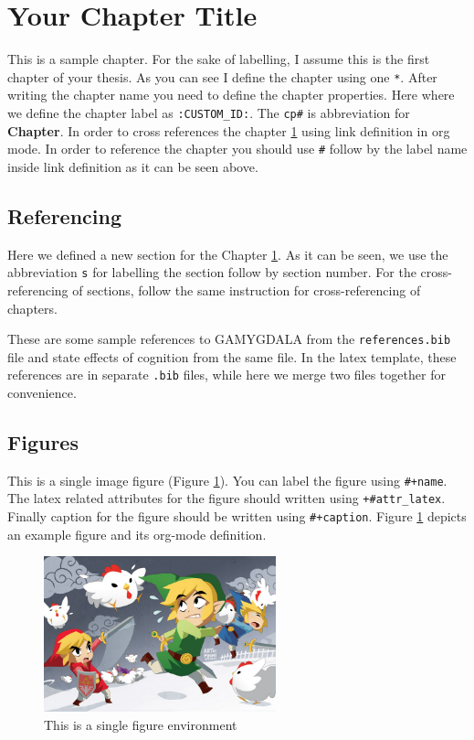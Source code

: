 \documentclass[11pt]{article}
\author{Habib Ghaffari Hadigheh}
\date{\today}
\title{}
\begin{document}
\tableofcontents

\section{Your Chapter Title}
\label{cp1}
This is a sample chapter. For the sake of labelling, I assume this is the first
chapter of your thesis. As you can see I define the chapter using one \texttt{*}. After
writing the chapter name you need to define the chapter properties. Here where
we define the chapter label as \texttt{:CUSTOM\_ID:}. The \texttt{cp\#} is abbreviation for
\textbf{Chapter}. In order to cross references the chapter \ref{cp1} using link definition
in org mode. In order to reference the chapter you should use \texttt{\#} follow by the
label name inside link definition as it can be seen above.

\subsection{Referencing}
\label{cp1:s1}
Here we defined a new section for the Chapter \ref{cp1}. As it can be seen, we use
the abbreviation \texttt{s} for labelling the section follow by section number. For the
cross-referencing of sections, follow the same instruction for
cross-referencing of  chapters.

These are some sample references to GAMYGDALA \citep{popescu2014gamygdala} from
the \texttt{references.bib} file and state effects of cognition
\citep{hudlicka2002time} from the same file. In the latex template, these
references are in separate \texttt{.bib} files, while here we merge two files
together for convenience.

\subsection{Figures}
\label{cp1:s2}
This is a single image figure (Figure \ref{cp1:s2:fig1}). You can label the figure
using \texttt{\#+name}. The latex related attributes for the figure should written using
\texttt{+\#attr\_latex}. Finally caption for the figure should be written using
\texttt{\#+caption}. Figure \ref{cp1:s2:fig1} depicts an example figure and its org-mode
definition.

\begin{figure}[!ht]
\centering
\includegraphics[width=0.6\textwidth]{./figures/Sample/tumblr_static_eaceks0rfxsss8o4swscw40wo.jpg}
\caption{\label{cp1:s2:fig1}This is a single figure environment}
\end{figure}
\end{document}
